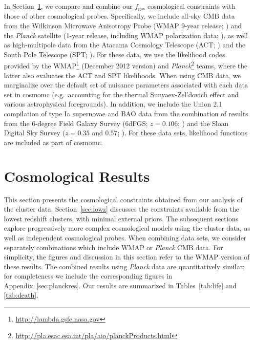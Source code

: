 \documentclass[useAMS,usenatbib,usegraphicx]{mn2e}
\newcommand*{\mysub}[2]{\ensuremath{#1_{\mathrm{#2}}}}
\newcommand*{\fgas}{\mysub{f}{gas}}
\newcommand*{\secref}{Section}
\newcommand*{\appref}{Appendix}
\newcommand*{\tabref}{Table}
\newcommand*{\Planck}{{\it Planck}}
\begin{document}
In \secref~\ref{sec:cosmores}, we compare and combine our \fgas{} cosmological constraints with those of other cosmological probes. Specifically, we include all-sky CMB data from the Wilkinson Microwave Anisotropy Probe (WMAP 9-year release; \citealt{Bennett1212.5225, Hinshaw1212.5226}) and the \Planck{} satellite (1-year release, including WMAP polarization data; \citealt{Planck1303.5075}), as well as high-multipole data from the Atacama Cosmology Telescope (ACT; \citealt{Das1301.1037}) and the South Pole Telescope (SPT; \citealt{Keisler1105.3182, Reichardt1111.0932, Story1210.7231}). For these data, we use the likelihood codes provided by the WMAP\footnote{\url{http://lambda.gsfc.nasa.gov}} (December 2012 version) and \Planck{}\footnote{\url{http://pla.esac.esa.int/pla/aio/planckProducts.html}} teams, where the latter also evaluates the ACT and SPT likelihoods. When using CMB data, we marginalize over the default set of nuisance parameters associated with each data set in {\sc cosmomc} (e.g.\ accounting for the thermal Sunyaev-Zel'dovich effect and various astrophysical foregrounds). In addition, we include the Union 2.1 compilation of type Ia supernovae \citep{Suzuki1105.3470} and BAO data from the combination of results from the 6-degree Field Galaxy Survey (6dFGS; $z=0.106$; \citealt{Beutler1106.3366}) and the Sloan Digital Sky Survey ($z=0.35$ and $0.57$; \citealt{Padmanabhan1202.0090, Anderson1303.4666}). For these data sets, likelihood functions are included as part of {\sc cosmomc}.







\section{Cosmological Results} \label{sec:cosmores}

This section presents the cosmological constraints obtained from our analysis of the cluster data. \secref~\ref{sec:lowz} discusses the constraints available from the lowest redshift clusters, with minimal external priors. The subsequent sections explore progressively more complex cosmological models using the cluster data, as well as independent cosmological probes. When combining data sets, we consider separately combinations which include WMAP or \Planck{} CMB data. For simplicity, the figures and discussion in this section refer to the WMAP version of these results. The combined results using \Planck{} data are quantitatively similar; for completeness we include the corresponding figures in \appref~\ref{sec:planckres}. Our results are summarized in \tabref{}s~\ref{tab:life} and \ref{tab:death}.
\end{document}
